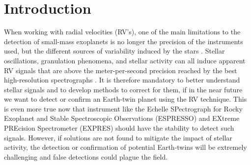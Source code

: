 \documentclass[11pt, oneside]{article}
\begin{document}



\section{Introduction} \label{intro}


When working with radial velocities (RV's), one of the main limitations to the detection of small-mass exoplanets is no longer the precision of the instruments used, but the different sources of variability induced by the stars \citep[e.g.][]{Feng:2017aa, Dumusque:2017aa, Rajpaul-2015, Robertson-2014}. 
Stellar oscillations, granulation phenomena, and stellar activity can all induce apparent RV signals \citep[e.g.][]{Saar-1997b, Queloz-2001, Desort-2007, Dumusque-2011a, Dumusque-2016a} that are above the meter-per-second precision reached by the best high-resolution spectrographs \citep[HARPS, HARPS-N,][]{Mayor-2003,Cosentino-2012}.
%
It is therefore mandatory to better understand stellar signals and to develop methods to correct for them, if in the near future we want to detect or confirm an Earth-twin planet using the RV technique. This is even more true now that instrument like the Echelle SPectrograph for Rocky Exoplanet and Stable Spectroscopic Observations (ESPRESSO) \citep{Pepe-2014} and EXtreme PREcision Spectrometer (EXPRES) \citep{fischer2016state} should have the stability to detect such signals. However, if solutions are not found to mitigate the impact of stellar activity, the detection or confirmation of potential Earth-twins will be extremely challenging and false detections could plague the field.
\end{document}
